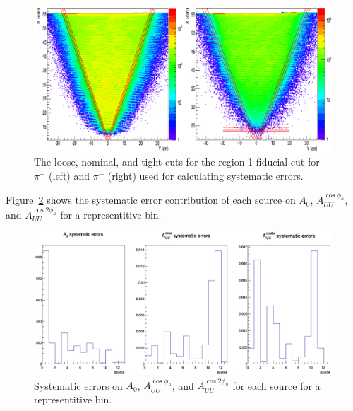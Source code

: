 %
\begin{figure}[htp]
\centering
\includegraphics[width=6in]{figures/pionSystematicCuts.png}
\caption{The loose, nominal, and tight cuts for the region 1 fiducial cut for $\pi^+$ (left) and $\pi^-$ (right) used for calculating systematic errors.}
\label{fig:pionSystematicCuts}
\end{figure}
%
Figure~\ref{fig:systematicErrors_representitiveBin} shows the systematic error contribution of each source on $A_0$, $A_{UU}^{\cos\phi_h}$, and $A_{UU}^{\cos 2\phi_h}$ for a representitive bin.
%
\begin{figure}[htp]
\centering
\includegraphics[width=6in]{figures/systematicErrors_representitiveBin.png}
\caption{Systematic errors on $A_0$, $A_{UU}^{\cos\phi_h}$, and $A_{UU}^{\cos 2\phi_h}$ for each source for a representitive bin.}
\label{fig:systematicErrors_representitiveBin}
\end{figure}
%

\clearpage
